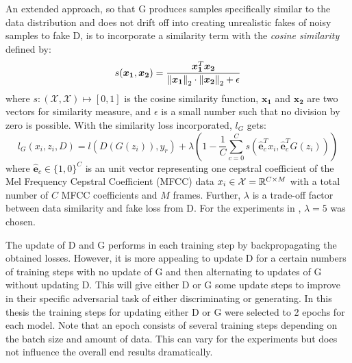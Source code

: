 An extended approach, so that G produces samples specifically similar to the data distribution and does not drift off into creating unrealistic fakes of noisy samples to fake D, is to incorporate a similarity term with the \emph{cosine similarity} defined by:
\begin{equation}
  s(\bm{x_1}, \bm{x_2}) = \frac{\bm{x_1}^T \bm{x_2}}{\norm{\bm{x_1}}_2 \cdot \norm{\bm{x_2}}_2 + \epsilon} 
\end{equation}
where $s : (\mathcal{X}, \mathcal{X}) \mapsto [0, 1]$ is the cosine similarity function, $\bm{x_1}$ and $\bm{x_2}$ are two vectors for similarity measure, and $\epsilon$ is a small number such that no division by zero is possible.
With the similarity loss incorporated, $l_G$ gets:
\begin{equation}
  l_G(x_i, z_i, D) =  l(D(G(z_i)), y_r) + \lambda \left(1 - \frac{1}{C} \sum_{c=0}^{C} s(\hat{\bm{e}}_c^T x_i , \hat{\bm{e}}_c^T G(z_i)) \right)
\end{equation}
where $\hat{\bm{e}}_c \in \{1, 0\}^C$ is an unit vector representing one cepstral coefficient of the Mel Frequency Cepstral Coefficient (MFCC) data $x_i \in \mathcal{X} = \mathbb{R}^{C \times M}$ with a total number of $C$ MFCC coefficients and $M$ frames.
Further, $\lambda$ is a trade-off factor between data similarity and fake loss from D.
For the experiments in , $\lambda = 5$ was chosen.

The update of D and G performs in each training step by backpropagating the obtained losses.
However, it is more appealing to update D for a certain numbers of training steps with no update of G and then alternating to updates of G without updating D.
This will give either D or G some update steps to improve in their specific adversarial task of either discriminating or generating.
In this thesis the training steps for updating either D or G were selected to 2 epochs for each model.
Note that an epoch consists of several training steps depending on the batch size and amount of data.
This can vary for the experiments but does not influence the overall end results dramatically.



